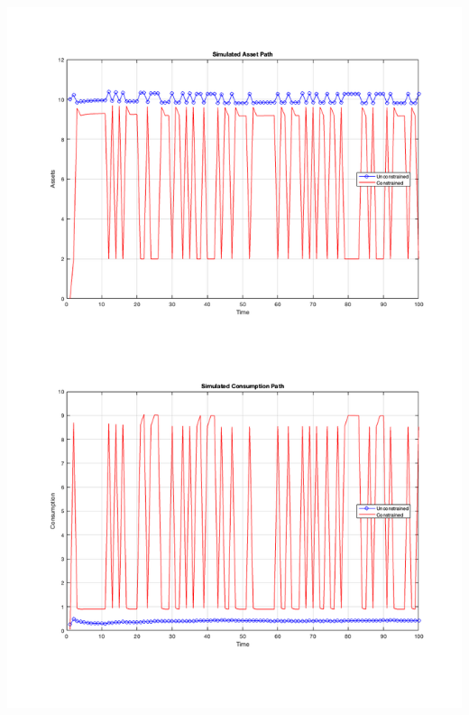 \documentclass[10pt,a4paper]{article}
\begin{document}
\begin{centering}
    \includegraphics*[width=18cm]{SIM.png}
  \end{centering}
\end{document}
